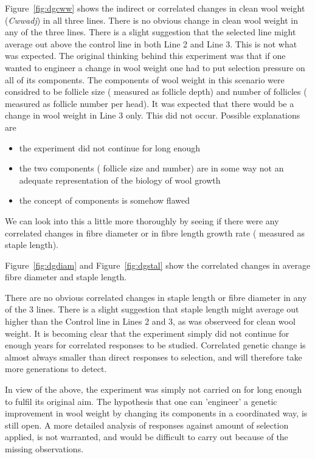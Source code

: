 \documentclass[titlepage]{article}  %
\begin{document}
Figure~\ref{fig:dgcww} shows the indirect or correlated changes in clean wool weight ({\em Cwwadj}) in all three lines. There is no obvious change in clean wool weight in any of the three lines. There is a slight suggestion that the selected line might average out above the control line in both Line 2 and Line 3. This is not what was expected. The original thinking behind this experiment was that if one wanted to engineer a change in wool weight one had to put selection pressure on all of its components. The components of wool weight in this scenario were considred to be follicle size ( measured as follicle depth) and number of follicles ( measured as follicle number per head). It was expected that there would be a change in wool weight in Line 3 only. This did not occur. Possible explanations are
\begin{itemize}
\item the experiment did not continue for long enough
\item the two components ( follicle size and number) are in some way not an adequate representation of the biology of wool growth
\item the concept of components is somehow flawed
\end{itemize}


We can look into this a little more thoroughly by seeing if there were any correlated changes in fibre diameter or in fibre length growth rate ( measured as staple length).

Figure~\ref{fig:dgdiam} and Figure~\ref{fig:dgstal} show the correlated changes in average fibre diameter and staple length.



There are no obvious correlated changes in staple length or fibre diameter in any of the 3 lines. There is a slight suggestion that staple length might average out higher than the Control line in Lines 2 and 3, as was observeed for clean wool weight. It is becoming clear that the experiment simply did not continue for enough years for correlated responses to be studied. Correlated genetic change is almost always smaller than direct responses to selection, and will therefore take more generations to detect. 

In view of the above, the experiment was simply not carried on for long enough to fulfil its original aim. The hypothesis that one can 'engineer' a genetic improvement in wool weight by changing its components in a coordinated way, is still open. A more detailed analysis of responses against amount of selection applied, is not warranted, and would be difficult to carry out because of the missing observations.
\end{document}
